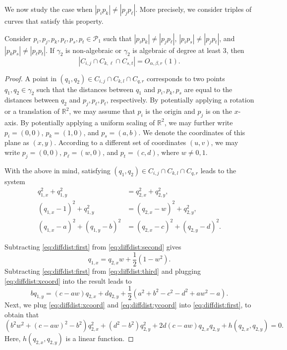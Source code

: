 \documentclass[11pt]{article}
\theoremstyle{definition}
\newcommand{\RR}{\mathbb R}
\newcommand{\pts}{\mathcal{P}}
\begin{document}
We now study the case when  $|p_ip_k| \neq |p_j p_\ell|$.
More precisely, we consider triples of curves that satisfy this property.

\begin{lemma}\label{lem:diffdist}
Consider $p_i,p_j,p_k,p_\ell,p_s,p_t\in \pts_1$ such that 
 $|p_i p_k| \neq |p_j p_\ell|$, 
 $|p_i p_s| \neq |p_j p_t|$, and 
 $|p_k p_s| \neq |p_\ell p_t|$.
If $\gamma_2$ is non-algebraic or $\gamma_2$ is algebraic of degree at least 3, then 
%
\[|C_{i,j}\cap C_{k,\ell} \cap C_{s,t}| =O_{\alpha,\beta,r}(1). \]
%
\end{lemma}
\begin{proof}
A point in $(q_1,q_2)\in C_{i,j}\cap C_{k,l} \cap C_{q,r}$ corresponds 
 to two points $q_1,q_2\in \gamma_2$
 such that the distances between $q_1$ and $p_i,p_k,p_s$ are equal to the distances between $q_2$ and $p_j, p_\ell,p_t$, respectively.
By potentially applying a rotation or a translation of $\RR^2$, we may assume that $p_i$ is the origin and $p_j$ is on the $x$-axis. 
By potentially applying a uniform scaling of $\RR^2$, we may further write 
$p_i = (0,0)$, $p_k = (1,0)$, and $p_s = (a,b)$.
We denote the coordinates of this plane as $(x,y)$. 
According to a different set of coordinates $(u,v)$, we may write $p_j=(0,0)$, $p_\ell = (w,0)$, and $p_t=(c,d)$, where $w\neq 0,1$.

With the above in mind, satisfying $(q_1,q_2)\in C_{i,j}\cap C_{k,l} \cap C_{q,r}$ leads to the system
 \begin{align}
   q_{1,x}^2+q_{1,y}^2 & = q_{2,x}^2+q_{2,y}^2, \label{eq:diffdist:first} \\[2mm]
  (q_{1,x}-1)^2 + q_{1,y}^2  & = (q_{2,x}-w)^2 + q_{2,y}^2, \label{eq:diffdist:second} \\[2mm]
  (q_{1,x}-a)^2 + (q_{1,y}-b)^2 & = (q_{2,x}-c)^2 + (q_{2,y}-d)^2. \label{eq:diffdist:third}
 \end{align}

Subtracting \eqref{eq:diffdist:first} from \eqref{eq:diffdist:second} gives 
 \begin{equation}\label{eq:diffdist:xcoord} 
  q_{1,x} = q_{2,x}w + \frac{1}{2}(1-w^2).
 \end{equation}
Subtracting \eqref{eq:diffdist:first} from \eqref{eq:diffdist:third}
 and plugging \eqref{eq:diffdist:xcoord} into the result leads to
 \begin{equation}\label{eq:diffdist:ycoord}
  bq_{1,y} = (c - aw) q_{2,x} +dq_{2,y} + \frac{1}{2}(a^2+b^2 -c^2 - d^2 +aw^2 -a).
 \end{equation}
%
Next, we plug \eqref{eq:diffdist:xcoord} and \eqref{eq:diffdist:ycoord} 
 into \eqref{eq:diffdist:first}, to obtain that
 \begin{equation}\label{eq:diffdist:quad}
  (b^2w^2 + (c-aw)^2 -b ^2) q_{2,x}^2 + (d^2-b^2) q_{2,y}^2 + 2d(c-aw)q_{2,x}q_{2,y} + h(q_{2,x},q_{2,y}) = 0.
 \end{equation}
Here, $h(q_{2,x},q_{2,y})$ is a linear function. 


\end{proof}
\end{document}

